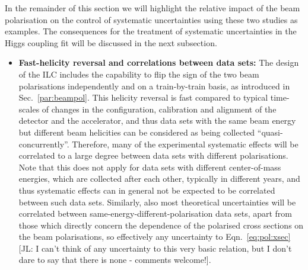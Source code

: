 In the remainder of this section we will highlight the relative impact of the beam polarisation on the control of systematic uncertainties using these two studies as examples. The consequences for the treatment of systematic uncertainties in the Higgs coupling fit will be discussed in the next subsection.

\begin{itemize}
\item {\textbf{Fast-helicity reversal and correlations between data sets:}} The design of the ILC includes the capability to flip the sign of the two beam polarisations independently and on a train-by-train basis, as introduced in Sec.~\ref{par:beampol}. This helicity reversal is fast compared to typical time-scales of changes in the configuration, calibration and alignment of the detector and the accelerator, and thus data sets with the same beam energy but different beam helicities can be considered as being collected ``quasi-concurrently''. Therefore, many of the experimental systematic effects will be correlated to a large degree between data sets with different polarisations. Note that this does not apply for data sets with different center-of-mass energies, which are collected after each other, typically in different years, and thus systematic effects can in general not be expected to be correlated between such data sets.
Similarly, also most theoretical uncertainties will be correlated between same-energy-different-polarisation data sets, apart from those which directly concern the dependence of the polarised cross sections on the beam polarisations, so effectively any uncertainty to Eqn.~\ref{eq:pol:xsec} {\color{red} [JL: I can't think of any uncertainty to this very basic relation, but I don't dare to say that there is none - comments welcome!]}.  


\end{itemize}
